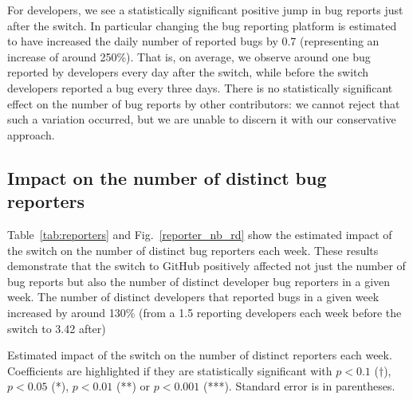 \documentclass[conference]{IEEEtran}
\begin{document}
For developers, we see a statistically significant positive jump in bug reports just after the switch. In particular changing the bug reporting platform is estimated to have increased the daily number of reported bugs by 0.7 (representing an increase of around 250\%). That is, on average, we observe around one bug reported by developers every day after the switch, %
while before the switch developers reported a bug every three days. There is no statistically significant effect on the number of bug reports by other contributors: we cannot reject that such a variation occurred, but we are unable to discern it with our conservative approach.

\subsection{Impact on the number of distinct bug reporters}

Table~\ref{tab:reporters} and Fig.~\ref{reporter_nb_rd} show the estimated impact of the switch on the number of distinct bug reporters each week. These results demonstrate that the switch to GitHub positively affected not just the number of bug reports but also the number of distinct developer bug reporters in a given week. The number of distinct developers that reported bugs in a given week increased by around 130\% (from a 1.5 reporting developers each week before the switch to 3.42 after)

\begin{table}
\centering
\caption{Estimated impact of the switch on the number of distinct reporters each week. Coefficients are highlighted if they are statistically significant with $p<0.1$ ($\dagger$), $p<0.05$ (*), $p<0.01$ (**) or $p<0.001$ (***). Standard error is in parentheses.}
\label{tab:reporters}

\end{table}
\end{document}
